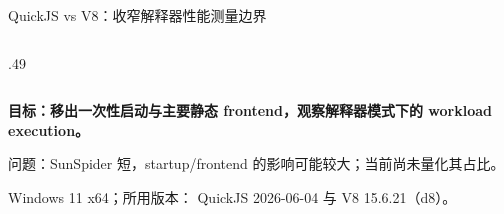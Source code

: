 \documentclass[aspectratio=169,UTF8]{ctexbeamer}
\newcommand{\smallfont}{\fontsize{7.8}{10}\selectfont}
\newcommand{\blue}[1]{\textcolor{MutedBlue}{\textbf{#1}}}
\newcommand{\source}[1]{}
\begin{document}
\begin{frame}[t]{QuickJS vs V8：收窄解释器性能测量边界}
\begin{columns}[T,onlytextwidth]
\begin{column}{.49\textwidth}
{
    \par}
  \end{column}
\end{columns}
\vspace{1.5mm}
\blue{目标：移出一次性启动与主要静态 frontend，观察解释器模式下的 workload execution。}\par
\vspace{1.5mm}
\smallfont
问题：SunSpider 短，startup/frontend 的影响可能较大；当前尚未量化其占比。\par
Windows 11 x64；所用版本： QuickJS 2026-06-04 与 V8 15.6.21（d8）。
\source{SunSpider 首轮结果；frontend isolation 与内部计时实验 README/results。}
\end{frame}
\end{document}
